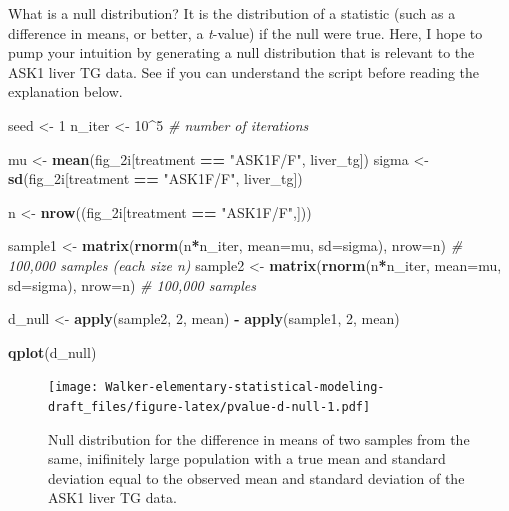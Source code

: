 \documentclass[]{book}
\newenvironment{Shaded}{\begin{snugshade}}{\end{snugshade}}
\newcommand{\CommentTok}[1]{\textcolor[rgb]{0.56,0.35,0.01}{\textit{#1}}}
\newcommand{\DataTypeTok}[1]{\textcolor[rgb]{0.13,0.29,0.53}{#1}}
\newcommand{\DecValTok}[1]{\textcolor[rgb]{0.00,0.00,0.81}{#1}}
\newcommand{\KeywordTok}[1]{\textcolor[rgb]{0.13,0.29,0.53}{\textbf{#1}}}
\newcommand{\NormalTok}[1]{#1}
\newcommand{\OperatorTok}[1]{\textcolor[rgb]{0.81,0.36,0.00}{\textbf{#1}}}
\newcommand{\StringTok}[1]{\textcolor[rgb]{0.31,0.60,0.02}{#1}}
\begin{document}
What is a null distribution? It is the distribution of a statistic (such as a difference in means, or better, a \emph{t}-value) if the null were true. Here, I hope to pump your intuition by generating a null distribution that is relevant to the ASK1 liver TG data. See if you can understand the script before reading the explanation below.

\begin{Shaded}
\begin{Highlighting}[]
\NormalTok{seed <-}\StringTok{ }\DecValTok{1}
\NormalTok{n_iter <-}\StringTok{ }\DecValTok{10}\OperatorTok{^}\DecValTok{5} \CommentTok{# number of iterations}

\NormalTok{mu <-}\StringTok{ }\KeywordTok{mean}\NormalTok{(fig_2i[treatment }\OperatorTok{==}\StringTok{ "ASK1F/F"}\NormalTok{, liver_tg]) }
\NormalTok{sigma <-}\StringTok{ }\KeywordTok{sd}\NormalTok{(fig_2i[treatment }\OperatorTok{==}\StringTok{ "ASK1F/F"}\NormalTok{, liver_tg])}

\NormalTok{n <-}\StringTok{ }\KeywordTok{nrow}\NormalTok{((fig_2i[treatment }\OperatorTok{==}\StringTok{ "ASK1F/F"}\NormalTok{,]))}

\NormalTok{sample1 <-}\StringTok{ }\KeywordTok{matrix}\NormalTok{(}\KeywordTok{rnorm}\NormalTok{(n}\OperatorTok{*}\NormalTok{n_iter, }\DataTypeTok{mean=}\NormalTok{mu, }\DataTypeTok{sd=}\NormalTok{sigma), }\DataTypeTok{nrow=}\NormalTok{n) }\CommentTok{# 100,000 samples (each size n)}
\NormalTok{sample2 <-}\StringTok{ }\KeywordTok{matrix}\NormalTok{(}\KeywordTok{rnorm}\NormalTok{(n}\OperatorTok{*}\NormalTok{n_iter, }\DataTypeTok{mean=}\NormalTok{mu, }\DataTypeTok{sd=}\NormalTok{sigma), }\DataTypeTok{nrow=}\NormalTok{n) }\CommentTok{# 100,000 samples}

\NormalTok{d_null <-}\StringTok{ }\KeywordTok{apply}\NormalTok{(sample2, }\DecValTok{2}\NormalTok{, mean) }\OperatorTok{-}\StringTok{ }\KeywordTok{apply}\NormalTok{(sample1, }\DecValTok{2}\NormalTok{, mean)}

\KeywordTok{qplot}\NormalTok{(d_null)}
\end{Highlighting}
\end{Shaded}

\begin{figure}
\centering
\texttt{[image: Walker-elementary-statistical-modeling-draft\_files/figure-latex/pvalue-d-null-1.pdf]}
\caption{\label{fig:pvalue-d-null}Null distribution for the difference in means of two samples from the same, inifinitely large population with a true mean and standard deviation equal to the observed mean and standard deviation of the ASK1 liver TG data.}
\end{figure}
\end{document}
